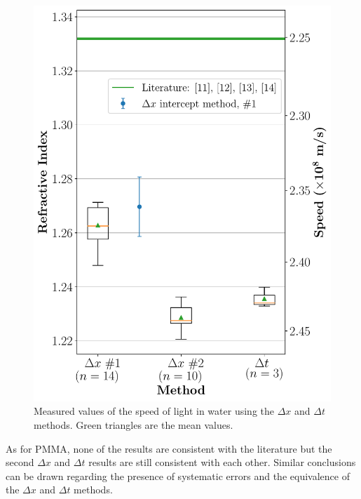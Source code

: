 \documentclass[
    aps,
    prl,
    reprint,
    10pt,
    amsmath,
    amssymb,
    a4paper,
    longbibliography
]{revtex4-2}
\begin{document}
\begin{figure}[ht]
    \centering
    \includegraphics[width=0.7\linewidth]{water}
    \caption{Measured values of the speed of light in water using
        the $\Delta x$ and $\Delta t$ methods. Green triangles are
        the mean values.}
    \label{water_plot}
\end{figure}

As for PMMA, none of the results are consistent with the literature but
the second $\Delta x$ and $\Delta t$ results are still consistent with
each other. Similar conclusions can be drawn regarding the presence of
systematic errors and the equivalence of the $\Delta x$ and $\Delta t$
methods.

~
\end{document}
